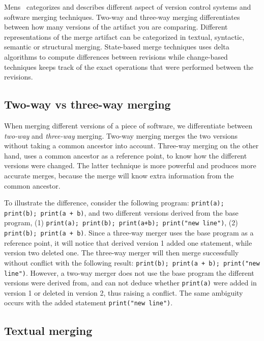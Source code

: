 \documentclass[a4paper,english]{ifimaster}
\begin{document}
Mens~\cite{cite:tom_mens_software_merging_survey} categorizes and describes different aspect of version control systems and software merging techniques. Two-way and three-way merging differentiates between how many versions of the artifact you are comparing. Different representations of the merge artifact can be categorized in textual, syntactic, semantic or structural merging. State-based merge techniques uses delta algorithms to compute differences between revisions while change-based techniques keeps track of the exact operations that were performed between the revisions.

\subsection{Two-way vs three-way merging}%
\label{sub:two_way_vs_three_way_merging}

When merging different versions of a piece of software, we differentiate between \textit{two-way} and \textit{three-way} merging. Two-way merging merges the two versions without taking a common ancestor into account. Three-way merging on the other hand, uses a common ancestor as a reference point, to know how the different versions were changed. The latter technique is more powerful and produces more accurate merges, because the merge will know extra information from the common ancestor.

To illustrate the difference, consider the following program: \texttt{print(a); print(b); print(a + b)}, and two different versions derived from the base program, (1) \texttt{print(a); print(b); print(a+b); print("new line")}, (2) \texttt{print(b); print(a + b)}. Since a three-way merger uses the base program as a reference point, it will notice that derived version 1 added one statement, while version two deleted one. The three-way merger will then merge successfully without conflict with the following result: \texttt{print(b); print(a + b); print("new line")}. However, a two-way merger does not use the base program the different versions were derived from, and can not deduce whether \texttt{print(a)} were added in version 1 or deleted in version 2, thus raising a conflict. The same ambiguity occurs with the added statement \texttt{print("new line")}.

\subsection{Textual merging}%
\label{sub:textual_merging}
\end{document}
